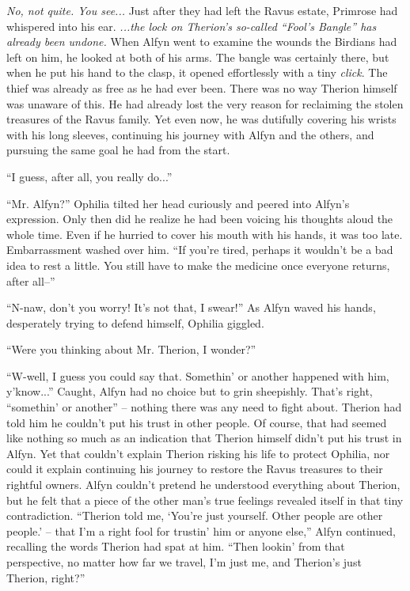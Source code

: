 \emph{No, not quite. You see...} Just after they had left the Ravus estate, Primrose had whispered into his ear. \emph{...the lock on Therion's so-called ``Fool's Bangle'' has already been undone.} When Alfyn went to examine the wounds the Birdians had left on him, he looked at both of his arms. The bangle was certainly there, but when he put his hand to the clasp, it opened effortlessly with a tiny \emph{click}. The thief was already as free as he had ever been. There was no way Therion himself was unaware of this. He had already lost the very reason for reclaiming the stolen treasures of the Ravus family. Yet even now, he was dutifully covering his wrists with his long sleeves, continuing his journey with Alfyn and the others, and pursuing the same goal he had from the start.

``I guess, after all, you really do...''

``Mr. Alfyn?'' Ophilia tilted her head curiously and peered into Alfyn's expression. Only then did he realize he had been voicing his thoughts aloud the whole time. Even if he hurried to cover his mouth with his hands, it was too late. Embarrassment washed over him. ``If you're tired, perhaps it wouldn't be a bad idea to rest a little. You still have to make the medicine once everyone returns, after all--''

``N-naw, don't you worry! It's not that, I swear!'' As Alfyn waved his hands, desperately trying to defend himself, Ophilia giggled. 

``Were you thinking about Mr. Therion, I wonder?''

``W-well, I guess you could say that. Somethin' or another happened with him, y'know...'' Caught, Alfyn had no choice but to grin sheepishly. That's right, ``somethin' or another'' -- nothing there was any need to fight about. Therion had told him he couldn't put his trust in other people. Of course, that had seemed like nothing so much as an indication that Therion himself didn't put his trust in Alfyn. Yet that couldn't explain Therion risking his life to protect Ophilia, nor could it explain continuing his journey to restore the Ravus treasures to their rightful owners. Alfyn couldn't pretend he understood everything about Therion, but he felt that a piece of the other man's true feelings revealed itself in that tiny contradiction. ``Therion told me, `You're just yourself. Other people are other people.' -- that I'm a right fool for trustin' him or anyone else,'' Alfyn continued, recalling the words Therion had spat at him. ``Then lookin' from that perspective, no matter how far we travel, I'm just me, and Therion's just Therion, right?''

